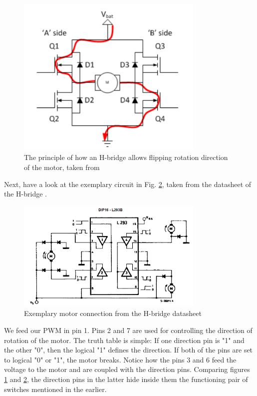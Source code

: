 \begin{figure}[htb]
    \centering
    \includegraphics[width=0.8\textwidth]{figures/hardware/H-Principle.PNG}
    \caption{The principle of how an H-bridge allows flipping rotation direction of the motor, taken from \cite{catchDiodes}}
    \label{fig:HPrinciple}
\end{figure}

\noindent
Next, have a look at the exemplary circuit in Fig. \ref{fig:HData}, taken from the datasheet of the H-bridge \cite{Hbridge}.

\begin{figure}[htb]
    \centering
    \includegraphics[width=0.8\textwidth]{figures/hardware/HbridgeDatasheet.PNG}
    \caption{Exemplary motor connection from the H-bridge datasheet}
    \label{fig:HData}
\end{figure}

\FloatBarrier
\noindent
We feed our PWM in pin 1. Pins 2 and 7 are used for controlling the direction of rotation of the motor. The truth table is simple: If one direction pin is "1" and the other "0", then the logical "1" defines the direction. If both of the pins are set to logical "0" or "1", the motor breaks. Notice how the pins 3 and 6 feed the voltage to the motor and are coupled with the direction pins. Comparing figures \ref{fig:HPrinciple} and \ref{fig:HData}, the direction pins in the latter hide inside them the functioning pair of switches mentioned in the earlier.

